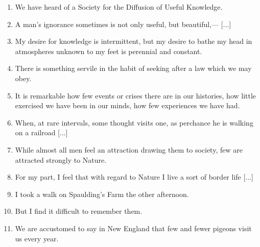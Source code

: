 \documentclass[twoside,openright,10pt]{memoir} %
\begin{document}
\begin{enumerate}
\item We have heard of a Society for the Diffusion of Useful Knowledge. \EBGaramond{}\textlangle\normalfont {} \thecount \EBGaramond{}\textrangle \normalfont
\item A man’s ignorance sometimes is not only useful, but \newline beautiful,— [...] \EBGaramond{}\textlangle\normalfont {} \thecount \EBGaramond{}\textrangle \normalfont
\item My desire for knowledge is intermittent, but my desire to bathe my head in atmospheres unknown to my feet is perennial and constant. \EBGaramond{}\textlangle\normalfont {} \thecount \EBGaramond{}\textrangle \normalfont
\item There is something servile in the habit of seeking after a law which we may obey. \EBGaramond{}\textlangle\normalfont {} \thecount \EBGaramond{}\textrangle \normalfont
\item It is remarkable how few events or crises there are in our histories, how little exercised we have been in our minds, how few experiences we have had. \EBGaramond{}\textlangle\normalfont {} \thecount \EBGaramond{}\textrangle \normalfont
\item When, at rare intervals, some thought visits one, as perchance he is walking on a railroad [...] \EBGaramond{}\textlangle\normalfont {} \thecount \EBGaramond{}\textrangle \normalfont
\item While almost all men feel an attraction drawing them to society, few are attracted strongly to Nature. \EBGaramond{}\textlangle\normalfont {} \thecount \EBGaramond{}\textrangle \normalfont
\item For my part, I feel that with regard to Nature I live a sort of border life [...] \EBGaramond{}\textlangle\normalfont {} \thecount \EBGaramond{}\textrangle \normalfont
\item I took a walk on Spaulding’s Farm the other afternoon.\newline \EBGaramond{}\textlangle\normalfont {} \thecount \EBGaramond{}\textrangle \normalfont
\item But I find it difficult to remember them. \EBGaramond{}\textlangle\normalfont {} \thecount \EBGaramond{}\textrangle \normalfont
\item We are accustomed to say in New England that few and fewer pigeons visit us every year. \EBGaramond{}\textlangle\normalfont {} \thecount \EBGaramond{}\textrangle \normalfont

\end{enumerate}
\end{document}
